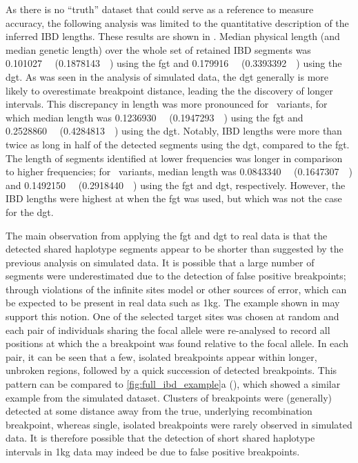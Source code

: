 %

%

As there is no ``truth'' dataset that could serve as a reference to measure accuracy, the following analysis was limited to the quantitative description of the inferred IBD lengths.
These results are shown in .
Median physical length (and median genetic length) over the whole set of retained IBD segments was
\SI{0.101027}{\mega\basepair} (\SI{0.1878143}{\centi\morgan}) using the \gls{fgt} and
\SI{0.179916}{\mega\basepair} (\SI{0.3393392}{\centi\morgan}) using the \gls{dgt}.
As was seen in the analysis of simulated data, the \gls{dgt} generally is more likely to overestimate breakpoint distance, leading the the discovery of longer intervals.
This discrepancy in length was more pronounced for ~variants, for which median length was
\SI{0.1236930}{\mega\basepair} (\SI{0.1947293}{\centi\morgan}) using the \gls{fgt} and
\SI{0.2528860}{\mega\basepair} (\SI{0.4284813}{\centi\morgan}) using the \gls{dgt}.
Notably, IBD lengths were more than twice as long in half of the detected segments using the \gls{dgt}, compared to the \gls{fgt}.
The length of segments identified at lower frequencies was longer in comparison to higher frequencies; \eg for ~variants, median length was
\SI{0.0843340}{\mega\basepair} (\SI{0.1647307}{\centi\morgan}) and
\SI{0.1492150}{\mega\basepair} (\SI{0.2918440}{\centi\morgan}) using the \gls{fgt} and \gls{dgt}, respectively.
However, the IBD lengths were highest at \fk{[3,5]} when the \gls{fgt} was used, but which was not the case for the \gls{dgt}.


%

%

The main observation from applying the \gls{fgt} and \gls{dgt} to real data is that the detected shared haplotype segments appear to be shorter than suggested by the previous analysis on simulated data.
It is possible that a large number of segments were underestimated due to the detection of false positive breakpoints; \eg through violations of the infinite sites model or other sources of error, which can be expected to be present in real data such as \gls{1kg}.
The example shown in  may support this notion.
One of the selected target sites was chosen at random and each pair of individuals sharing the focal allele were re-analysed to record all positions at which the a breakpoint was found relative to the focal allele.
In each pair, it can be seen that a few, isolated breakpoints appear within longer, unbroken regions, followed by a quick succession of detected breakpoints.
This pattern can be compared to \cref{fig:full_ibd_example}{a} (), which showed a similar example from the simulated dataset.
Clusters of breakpoints were (generally) detected at some distance away from the true, underlying recombination breakpoint, whereas single, isolated breakpoints were rarely observed in simulated data.
It is therefore possible that the detection of short shared haplotype intervals in \gls{1kg} data may indeed be due to false positive breakpoints.



